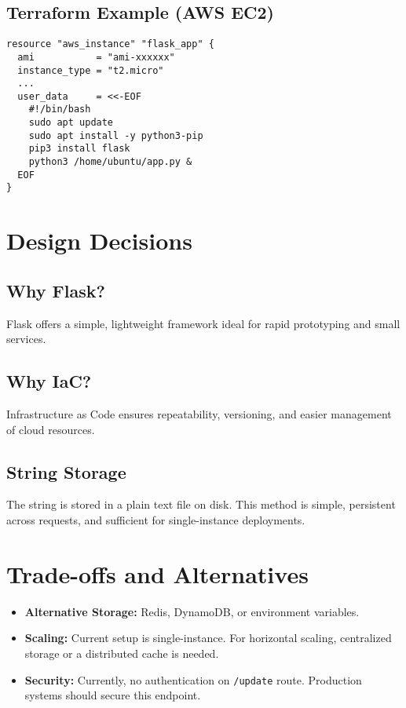 \documentclass[12pt]{article}
\begin{document}
\subsection*{Terraform Example (AWS EC2)}
\begin{lstlisting}
resource "aws_instance" "flask_app" {
  ami           = "ami-xxxxxx"
  instance_type = "t2.micro"
  ...
  user_data     = <<-EOF
    #!/bin/bash
    sudo apt update
    sudo apt install -y python3-pip
    pip3 install flask
    python3 /home/ubuntu/app.py &
  EOF
}
\end{lstlisting}

\section{Design Decisions}
\subsection*{Why Flask?}
Flask offers a simple, lightweight framework ideal for rapid prototyping and small services.

\subsection*{Why IaC?}
Infrastructure as Code ensures repeatability, versioning, and easier management of cloud resources.

\subsection*{String Storage}
The string is stored in a plain text file on disk. This method is simple, persistent across requests, and sufficient for single-instance deployments.

\section{Trade-offs and Alternatives}
\begin{itemize}
    \item \textbf{Alternative Storage:} Redis, DynamoDB, or environment variables.
    \item \textbf{Scaling:} Current setup is single-instance. For horizontal scaling, centralized storage or a distributed cache is needed.
    \item \textbf{Security:} Currently, no authentication on \texttt{/update} route. Production systems should secure this endpoint.
\end{itemize}
\end{document}

